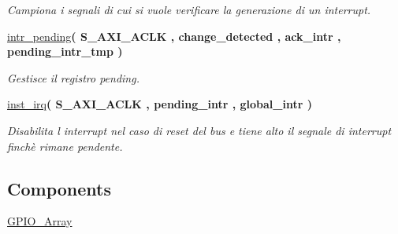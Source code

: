 \begin{DoxyCompactItemize}
\begin{DoxyCompactList}\small\item\em Campiona i segnali di cui si vuole verificare la generazione di un interrupt. \end{DoxyCompactList}\item 
\hyperlink{classGPIO__v1__0__S00__AXI_1_1arch__imp_a27a13ac4e8c3307360aa906035c2e140}{intr\+\_\+pending}{\bfseries  ( {\bfseries \textcolor{vhdlchar}{S\+\_\+\+A\+X\+I\+\_\+\+A\+C\+LK}\textcolor{vhdlchar}{ }} , {\bfseries \textcolor{vhdlchar}{change\+\_\+detected}\textcolor{vhdlchar}{ }} , {\bfseries \textcolor{vhdlchar}{ack\+\_\+intr}\textcolor{vhdlchar}{ }} , {\bfseries \textcolor{vhdlchar}{pending\+\_\+intr\+\_\+tmp}\textcolor{vhdlchar}{ }} )}
\begin{DoxyCompactList}\small\item\em Gestisce il registro pending. \end{DoxyCompactList}\item 
\hyperlink{classGPIO__v1__0__S00__AXI_1_1arch__imp_ad49f0dfc577739899b90a7243c22a1cd}{inst\+\_\+irq}{\bfseries  ( {\bfseries \textcolor{vhdlchar}{S\+\_\+\+A\+X\+I\+\_\+\+A\+C\+LK}\textcolor{vhdlchar}{ }} , {\bfseries \textcolor{vhdlchar}{pending\+\_\+intr}\textcolor{vhdlchar}{ }} , {\bfseries \textcolor{vhdlchar}{global\+\_\+intr}\textcolor{vhdlchar}{ }} )}
\begin{DoxyCompactList}\small\item\em Disabilita l\textquotesingle{} interrupt nel caso di reset del bus e tiene alto il segnale di interrupt finchè rimane pendente. \end{DoxyCompactList}\end{DoxyCompactItemize}
\subsection*{Components}
 \begin{DoxyCompactItemize}
\item 
\mbox{\label{classGPIO__v1__0__S00__AXI_1_1arch__imp_a7f7f55a1fb49e8857e13928560e7c192}} 
\hyperlink{classGPIO__v1__0__S00__AXI_1_1arch__imp_a7f7f55a1fb49e8857e13928560e7c192}{G\+P\+I\+O\+\_\+\+Array}  {\bfseries }  
\end{DoxyCompactItemize}
